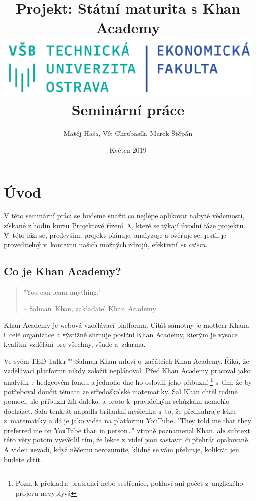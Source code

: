 \documentclass[12pt, a4paper]{report}
\author{Matěj Haša, Vít Chrubasík, Marek Štěpán}
\date{Květen 2019}
\title{Projekt: Státní maturita s Khan Academy\\\medskip
\large \includegraphics[width=\linewidth]{./images/skola_logo.png} Seminární práce}
\begin{document}
\maketitle
\tableofcontents
\thispagestyle{empty}
\listoftables
\thispagestyle{empty}
\listoffigures
\thispagestyle{empty}



\chapter{Úvod}
\label{sec:org14094a2}
V této seminární práci se budeme snažit co nejlépe aplikovat nabyté vědomosti,
získané z hodin kurzu Projektové řízení A, které se týkají úvodní fáze projektu.
V této fázi se, především, projekt plánuje, analyzuje a ověřuje se, jestli je
proveditelný v kontextu našich možných zdrojů, efektivní \emph{et cetera}.

\section{Co je Khan Academy?}
\label{sec:org22c7301}
\label{orge0f9e9b}
\begin{quote}
"You can learn anything."

-- Salman Khan, zakladatel Khan Academy
\end{quote}

Khan Academy je webová vzdělávací platforma. Citát samotný je mottem Khana i celé
organizace a výstižně shrnuje poslání Khan Academy, kterým je vysoce kvalitní
vzdělání pro všechny, všude a zdarma.

Ve svém TED Talku "" Salman Khan mluví o začátcích Khan
Academy. Říká, že vzdělávací platformu nikdy založit neplánoval. Před Khan
Academy pracoval jako analytik v hedgeovém fondu a jednoho dne ho oslovili jeho
příbuzní \footnote{Pozn. k překladu: bratranci nebo sestřenice, pohlaví ani počet
z anglického projevu nevyplývá} s tím, že by potřeboval doučit témata ze
středoškolské matematiky. Sal Khan chtěl rodině pomoci, ale příbuzní žili
daleko, a proto k pravidelným schůzkám nemohlo docházet. Sala tenkrát napadla
brilantní myšlenka a to, že přednahraje lekce z matematiky a dá je jako videa na
platformu YouTube. "They told me that they preferred me on YouTube than in
person\ldots{}" vtipně poznamenal Khan, ale subtext této věty potom vysvětlil tím, že
lekce z videí jsou zastavit či přehrát opakovaně. A videu nevadí, když něčemu
nerozumíte, klidně se vám přehraje, kolikrát jen budete chtít.
\end{document}
